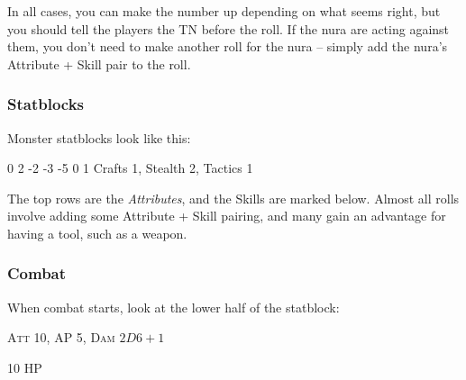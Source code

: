 \begin{multicols}{2}
{  In all cases, you can make the number up depending on what seems right, but you should tell the players the TN before the roll.
  If the nura are acting against them, you don't need to make another roll for the nura -- simply add the nura's Attribute + Skill pair to the roll.

  \subsubsection{Statblocks}
  Monster statblocks look like this:

  {0}%
  {2}%
  {{-2}%
  {-3}%
  {-5}}%
  {0}%
  {1}%
  {Crafts 1, Stealth 2, Tactics 1}%
  {\Dagger}%
  {}

  The top rows are the \textit{Attributes}, and the Skills are marked below.
  Almost all rolls involve adding some Attribute + Skill pairing, and many gain an advantage for having a tool, such as a weapon.

  \subsubsection{Combat}

  When combat starts, look at the lower half of the statblock:

  \hrulefill

  {\scshape Att 10, AP 5, Dam $2D6+1$}

  10 HP {\large{}}

  \begin{itemize}


\end{itemize}}
\end{multicols}
